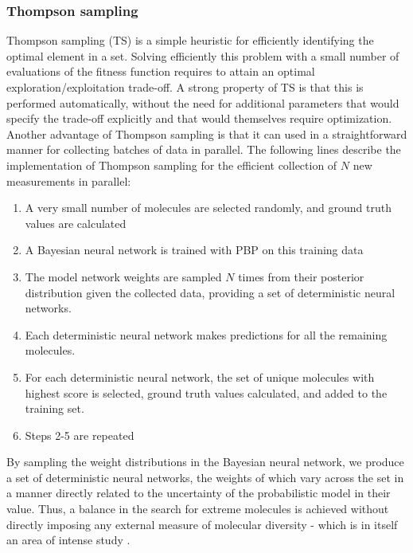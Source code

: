 \subsubsection{Thompson sampling}

Thompson sampling (TS) \cite{Thompson_1933} is a simple heuristic for efficiently identifying the optimal element in a set. Solving efficiently this problem with a small number of evaluations of the fitness function requires to attain an optimal exploration/exploitation trade-off. A strong property of TS  is that this is performed automatically, without the need for additional parameters that would specify the trade-off explicitly and that would themselves require optimization. Another advantage of Thompson sampling is that it can used in a straightforward manner for collecting batches of data in parallel. The following lines describe the implementation of Thompson sampling for the efficient collection of $N$ new measurements in parallel:
\begin{enumerate}
\item A very small number of molecules are selected randomly, and ground truth values are calculated
\item A Bayesian neural network is trained with PBP on this training data
\item The model network weights are sampled $N$ times from their posterior distribution given the collected data, providing a set of deterministic neural networks.
\item Each deterministic neural network makes predictions for all the remaining molecules.
\item For each deterministic neural network, the set of unique molecules with highest score is selected, ground truth values calculated, and added to the training set.
\item Steps 2-5 are repeated
\end{enumerate}
By sampling the weight distributions in the Bayesian neural network, we produce a set of deterministic neural networks, the weights of which vary across the set in a manner directly related to the uncertainty of the probabilistic model in their value.  Thus, a balance in the search for extreme molecules is achieved without directly imposing any external measure of molecular diversity - which is in itself an area of intense study \cite{Maldonado_2006}.